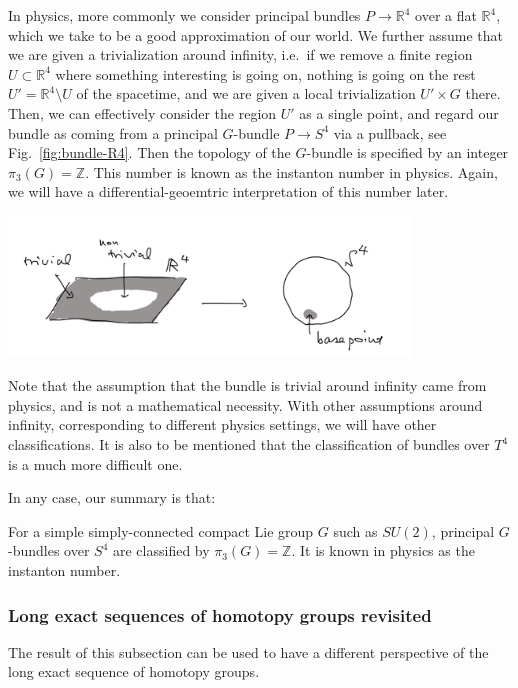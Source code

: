 \documentclass[12pt]{article}
\numberwithin{equation}{section}
\renewenvironment{figure}[1][]{
  \begin{originalfigure}[#1]
    \begin{mdframed}[linecolor=black!0,backgroundcolor=black!1]
}{
    \end{mdframed}
  \end{originalfigure}
}
\def\bR{\mathbb{R}}
\def\bZ{\mathbb{Z}}
\begin{document}
In physics,  more commonly we consider  principal bundles $P\to \bR^4$ over a flat $\bR^4$,
which we take to be a good approximation of our world.
We further assume that we are given a trivialization around infinity,
i.e.~if we remove a finite region $U\subset \bR^4$ 
where something interesting is going on,
nothing is going on the rest $U'=\bR^4 \setminus U$ of the spacetime,
and we are given a local trivialization $U'\times G$ there.
Then, we can effectively consider the region $U'$ as a single point,
and regard our bundle as coming from a principal $G$-bundle  $P\to S^4$
via a pullback, see Fig.~\ref{fig:bundle-R4}.
Then the topology of the $G$-bundle is specified by an integer $\pi_3(G)=\bZ$.
This number is known as the instanton number in physics.
Again, we will have a differential-geoemtric interpretation of this number later.

\begin{figure}[h]
  \centering
  \includegraphics[width=0.8\textwidth]{bundle-R4.png}
  \caption{Principal bundle over $\bR^4$ with a trivialization around infinity
  is given by a pull-back from $S^4$}
  \label{fig:bundle-R4}
\end{figure}

Note that the assumption that the bundle is trivial around infinity 
came from physics, and is not a mathematical necessity.
With other assumptions around infinity,
corresponding to different physics settings,
we will have other classifications.
It is also to be mentioned that the classification of bundles over $T^4$ 
is a much more difficult one.

In any case, our summary is that:
\begin{example}
For a simple simply-connected compact Lie group $G$ such as $SU(2)$,
principal $G$-bundles over $S^4$ are classified by 
$\pi_3(G)=\bZ$.
It is known in physics as the instanton number.
\end{example}

\subsubsection{Long exact sequences of homotopy groups revisited}
\label{sec:long-exact-and-bundles}
The result of this subsection can be used to have 
a different perspective 
of the long exact sequence of homotopy groups.
\end{document}
